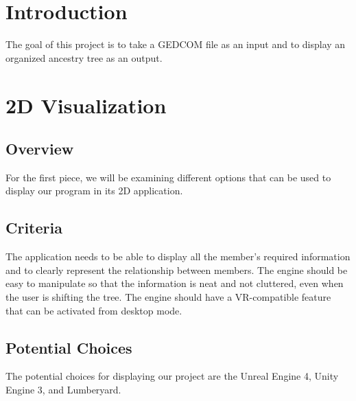 \documentclass[onecolumn, draftclsnofoot,10pt, compsoc]{IEEEtran}
\begin{document}
\section{Introduction}
The goal of this project is to take a GEDCOM file as an input and to display an organized ancestry tree as an output. 

\section{2D Visualization}
\subsection{Overview}
\begin{singlespace}
For the first piece, we will be examining different options that can be used to display our program in its 2D application. 
\end{singlespace}




\subsection{Criteria}
\begin{singlespace}
The application needs to be able to display all the member’s required information and to clearly represent the relationship between members. The engine should be easy to manipulate so that the information is neat and not cluttered, even when the user is shifting the tree. The engine should have a VR-compatible feature that can be activated from desktop mode.  
\end{singlespace}

\subsection{Potential Choices}
\begin{singlespace}
The potential choices for displaying our project are the Unreal Engine 4, Unity Engine 3, and Lumberyard.  
\end{singlespace}
\end{document}
